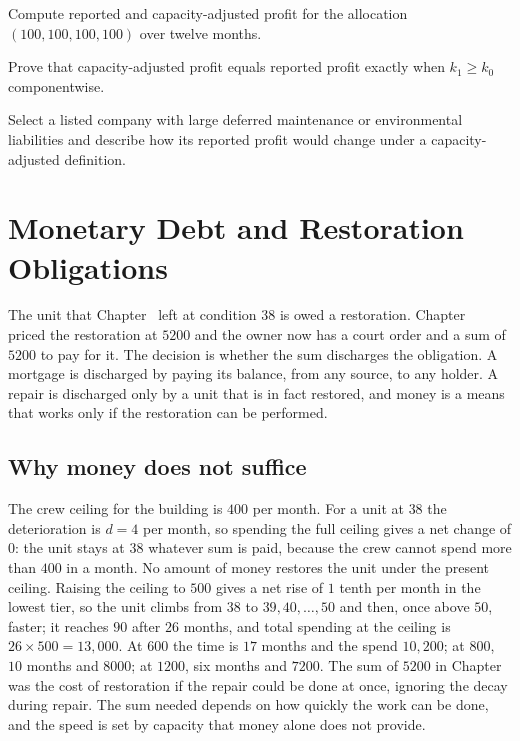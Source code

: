 \begin{exercise}
Compute reported and capacity-adjusted profit for the allocation $(100,100,100,100)$ over twelve months.
\end{exercise}
\begin{exercise}
Prove that capacity-adjusted profit equals reported profit exactly when $k_1\ge k_0$ componentwise.
\end{exercise}
\begin{exercise}
Select a listed company with large deferred maintenance or environmental liabilities and describe how its reported profit would change under a capacity-adjusted definition.
\end{exercise}

\chapter{Monetary Debt and Restoration Obligations}\label{ch:19}

The unit that Chapter~ left at condition $38$ is owed a restoration. Chapter~ priced the restoration at $5200$ and the owner now has a court order and a sum of $5200$ to pay for it. The decision is whether the sum discharges the obligation. A mortgage is discharged by paying its balance, from any source, to any holder. A repair is discharged only by a unit that is in fact restored, and money is a means that works only if the restoration can be performed.

\section{Why money does not suffice}

The crew ceiling for the building is $400$ per month. For a unit at $38$ the deterioration is $d=4$ per month, so spending the full ceiling gives a net change of $0$: the unit stays at $38$ whatever sum is paid, because the crew cannot spend more than $400$ in a month. No amount of money restores the unit under the present ceiling. Raising the ceiling to $500$ gives a net rise of $1$ tenth per month in the lowest tier, so the unit climbs from $38$ to $39,40,\dots,50$ and then, once above $50$, faster; it reaches $90$ after $26$ months, and total spending at the ceiling is $26\times 500=13{,}000$. At $600$ the time is $17$ months and the spend $10{,}200$; at $800$, $10$ months and $8000$; at $1200$, six months and $7200$. The sum of $5200$ in Chapter~ was the cost of restoration if the repair could be done at once, ignoring the decay during repair. The sum needed depends on how quickly the work can be done, and the speed is set by capacity that money alone does not provide.

